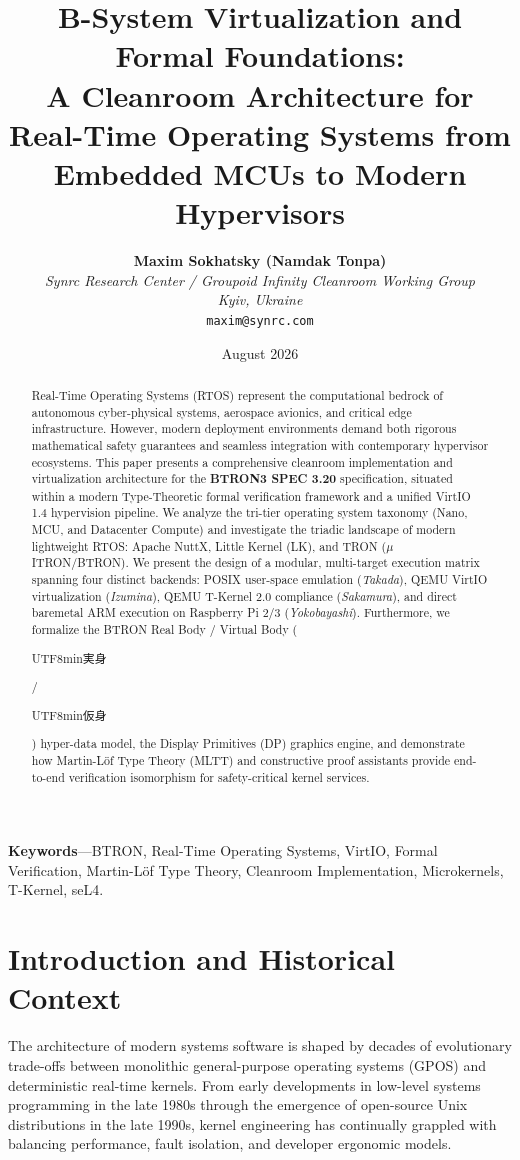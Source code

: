 \documentclass[10pt,journal,compsoc,twocolumn]{article}
\title{\LARGE \textbf{B-System Virtualization and Formal Foundations:\\A Cleanroom Architecture for Real-Time Operating Systems from Embedded MCUs to Modern Hypervisors}}
\author{
    \textbf{Maxim Sokhatsky (Namdak Tonpa)}\\[0.3em]
    \small \textit{Synrc Research Center / Groupoid Infinity Cleanroom Working Group}\\
    \small \textit{Kyiv, Ukraine}\\
    \small \texttt{maxim@synrc.com}
}
\date{August 2026}
\newcommand{\ja}[1]{\begin{CJK*}{UTF8}{min}#1\end{CJK*}}
\begin{document}
\maketitle

\begin{abstract}
Real-Time Operating Systems (RTOS) represent the computational bedrock of autonomous cyber-physical systems, aerospace avionics, and critical edge infrastructure. However, modern deployment environments demand both rigorous mathematical safety guarantees and seamless integration with contemporary hypervisor ecosystems. This paper presents a comprehensive cleanroom implementation and virtualization architecture for the \textbf{BTRON3 SPEC 3.20} specification, situated within a modern Type-Theoretic formal verification framework and a unified VirtIO 1.4 hypervision pipeline. We analyze the tri-tier operating system taxonomy (Nano, MCU, and Datacenter Compute) and investigate the triadic landscape of modern lightweight RTOS: Apache NuttX, Little Kernel (LK), and TRON ($\mu$ITRON/BTRON). We present the design of a modular, multi-target execution matrix spanning four distinct backends: POSIX user-space emulation (\emph{Takada}), QEMU VirtIO virtualization (\emph{Izumina}), QEMU T-Kernel 2.0 compliance (\emph{Sakamura}), and direct baremetal ARM execution on Raspberry Pi 2/3 (\emph{Yokobayashi}). Furthermore, we formalize the BTRON Real Body / Virtual Body (\ja{実身}/\ja{仮身}) hyper-data model, the Display Primitives (DP) graphics engine, and demonstrate how Martin-Löf Type Theory (MLTT) and constructive proof assistants provide end-to-end verification isomorphism for safety-critical kernel services.
\end{abstract}

\noindent\textbf{\small Keywords}---BTRON, Real-Time Operating Systems, VirtIO, Formal Verification, Martin-Löf Type Theory, Cleanroom Implementation, Microkernels, T-Kernel, seL4.

\section{Introduction and Historical Context}
\label{sec:intro}

The architecture of modern systems software is shaped by decades of evolutionary trade-offs between monolithic general-purpose operating systems (GPOS) and deterministic real-time kernels. From early developments in low-level systems programming in the late 1980s through the emergence of open-source Unix distributions in the late 1990s, kernel engineering has continually grappled with balancing performance, fault isolation, and developer ergonomic models.
\end{document}
